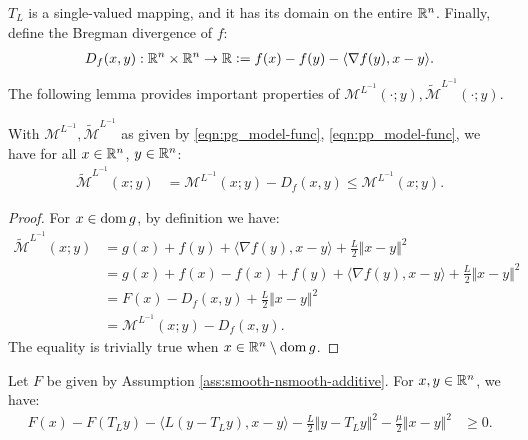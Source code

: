 \documentclass[12pt]{article}
\begin{document}
    $T_L$ is a single-valued mapping, and it has its domain on the entire $\mathbb R^n$. 
    Finally, define the Bregman divergence of $f$: 
    \begin{align*}
        D_f(x, y): \mathbb R^n \times \mathbb R^n \rightarrow \mathbb R 
        \vcentcolon= f(x) - f(y) - \langle \nabla f(y), x - y\rangle. 
    \end{align*}
    The following lemma provides important properties of $\mathcal M^{L^{-1}}(\cdot; y), \widetilde{\mathcal M}^{L^{-1}}(\cdot; y)$. 
    \begin{lemma}\label{lemma:pg-envelope}
        With $\mathcal M^{L^{-1}}, \widetilde{\mathcal M}^{L^{-1}}$ as given by \eqref{eqn:pg_model-func}, \eqref{eqn:pp_model-func}, 
        we have for all $x \in \mathbb R^n$, $y \in \mathbb R^n$:
        \begin{align*}
            \widetilde{\mathcal M}^{L^{-1}}(x; y)
            &= 
            \mathcal M^{L^{-1}}(x; y)- D_f(x, y) \le \mathcal M^{L^{-1}}(x; y). 
        \end{align*}
    \end{lemma}
    \begin{proof}
        For $x \in \operatorname{dom} g$, by definition we have: 
        \begin{align*}
            \widetilde{\mathcal M}^{L^{-1}}(x; y) 
            &= 
            g(x) + f(y) + \langle \nabla f(y), x - y\rangle + \frac{L}{2}\Vert x - y\Vert^2
            \\
            &= 
            g(x) + f(x) - f(x) + f(y) 
            + \langle \nabla f(y), x - y\rangle + \frac{L}{2}\Vert x - y\Vert^2
            \\
            &= 
            F(x) - D_f(x, y) + \frac{L}{2}\Vert x - y\Vert^2 
            \\
            &= \mathcal M^{L^{-1}}(x; y) - D_f(x, y). 
        \end{align*}
        The equality is trivially true when $x \in \mathbb R^n \setminus \operatorname{dom} g$. 
    \end{proof}
    \begin{theorem}\label{thm:prox-grad-ineq}
        Let $F$ be given by Assumption \ref{ass:smooth-nsmooth-additive}. 
        For $x,y\in \mathbb R^n$, we have: 
        \begin{align*}
            F(x) - F(T_Ly) - \langle L(y - T_Ly), x - y\rangle
            - \frac{L}{2}\Vert y - T_L y\Vert^2
            - \frac{\mu}{2}\Vert x - y\Vert^2
            &\ge  
            0.
        \end{align*}
    \end{theorem}
\end{document}
